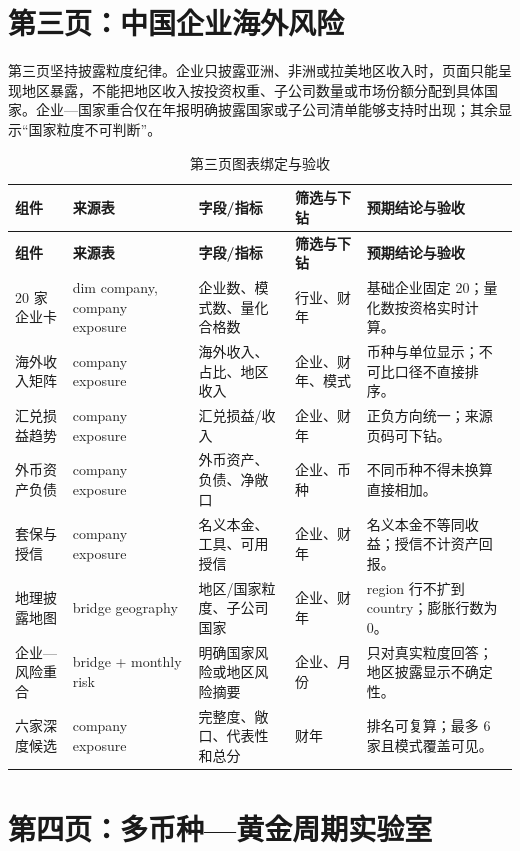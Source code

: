 \documentclass[UTF8,fontset=windows,12pt,openany]{ctexbook}
\begin{document}
\chapter{第三页：中国企业海外风险}

第三页坚持披露粒度纪律。企业只披露亚洲、非洲或拉美地区收入时，页面只能呈现地区暴露，不能把地区收入按投资权重、子公司数量或市场份额分配到具体国家。企业—国家重合仅在年报明确披露国家或子公司清单能够支持时出现；其余显示“国家粒度不可判断”。

\clearpage
\begin{landscape}
\begin{longtable}{p{3.3cm}p{3.5cm}p{4.5cm}p{3.1cm}p{4.5cm}}
\caption{第三页图表绑定与验收}\label{tab:page3-map}\\
\toprule
\textbf{组件} & \textbf{来源表} & \textbf{字段/指标} & \textbf{筛选与下钻} & \textbf{预期结论与验收}\\
\midrule
\endfirsthead
\toprule \textbf{组件} & \textbf{来源表} & \textbf{字段/指标} & \textbf{筛选与下钻} & \textbf{预期结论与验收}\\ \midrule
\endhead
20 家企业卡 & dim company, company exposure & 企业数、模式数、量化合格数 & 行业、财年 & 基础企业固定 20；量化数按资格实时计算。\\
海外收入矩阵 & company exposure & 海外收入、占比、地区收入 & 企业、财年、模式 & 币种与单位显示；不可比口径不直接排序。\\
汇兑损益趋势 & company exposure & 汇兑损益/收入 & 企业、财年 & 正负方向统一；来源页码可下钻。\\
外币资产负债 & company exposure & 外币资产、负债、净敞口 & 企业、币种 & 不同币种不得未换算直接相加。\\
套保与授信 & company exposure & 名义本金、工具、可用授信 & 企业、财年 & 名义本金不等同收益；授信不计资产回报。\\
地理披露地图 & bridge geography & 地区/国家粒度、子公司国家 & 企业、财年 & region 行不扩到 country；膨胀行数为 0。\\
企业—风险重合 & bridge + monthly risk & 明确国家风险或地区风险摘要 & 企业、月份 & 只对真实粒度回答；地区披露显示不确定性。\\
六家深度候选 & company exposure & 完整度、敞口、代表性和总分 & 财年 & 排名可复算；最多 6 家且模式覆盖可见。\\
\bottomrule
\end{longtable}
\end{landscape}

\chapter{第四页：多币种—黄金周期实验室}
\end{document}
